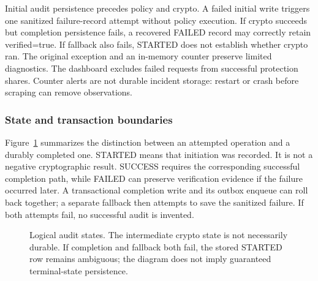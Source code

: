 \documentclass[conference,a4paper]{IEEEtran}
\begin{document}
Initial audit persistence precedes policy and crypto. A failed initial write triggers one sanitized failure-record attempt without policy execution. If crypto succeeds but completion persistence fails, a recovered FAILED record may correctly retain verified=true. If fallback also fails, STARTED does not establish whether crypto ran. The original exception and an in-memory counter preserve limited diagnostics. The dashboard excludes failed requests from successful protection shares. Counter alerts are not durable incident storage: restart or crash before scraping can remove observations.

\subsubsection{State and transaction boundaries}
Figure~\ref{auditstate} summarizes the distinction between an attempted operation and a durably completed one. STARTED means that initiation was recorded. It is not a negative cryptographic result. SUCCESS requires the corresponding successful completion path, while FAILED can preserve verification evidence if the failure occurred later. A transactional completion write and its outbox enqueue can roll back together; a separate fallback then attempts to save the sanitized failure. If both attempts fail, no successful audit is invented.

\begin{figure}[t]
\centering
{}
\caption{Logical audit states. The intermediate crypto state is not necessarily durable. If completion and fallback both fail, the stored STARTED row remains ambiguous; the diagram does not imply guaranteed terminal-state persistence.}
\label{auditstate}
\end{figure}
\end{document}
